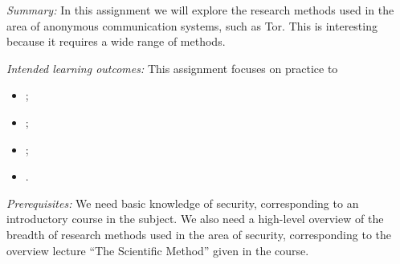 
\emph{Summary:}
In this assignment we will explore the research methods used in the area of 
anonymous communication systems, such as Tor.
This is interesting because it requires a wide range of methods.

\emph{Intended learning outcomes:}
This assignment focuses on practice to
\begin{itemize}
  \item \LOrelate;
  \item \LOevaluate;
  \item \LOapply;
  \item \LOcomm.
\end{itemize}

\emph{Prerequisites:}
We need basic knowledge of security, corresponding to an introductory course in 
the subject.
We also need a high-level overview of the breadth of research methods used in 
the area of security, corresponding to the overview lecture \enquote{The 
Scientific Method} given in the course.
